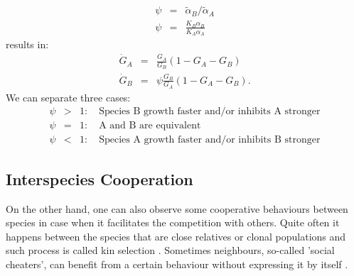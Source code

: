 \documentclass[10pt,A4paper]{article}
\begin{document}
\begin{eqnarray}
\psi&=&\tilde{\alpha}_B/\tilde{\alpha}_A\\
\psi&=&\frac{K_B\alpha_B}{K_A\alpha_A}
\end{eqnarray}
results in: 
\begin{eqnarray}
\dot{G}_A &=&\frac{G_A}{G_B}\left(1 - G_A-G_B\right )\\
\dot{G}_B &=&\psi\frac{G_B}{G_A}\left(1-G_A-G_B\right ). 
\end{eqnarray}
We can separate three cases: 
\begin{eqnarray}
\psi&>&1:\quad\text{Species B growth faster and/or inhibits A stronger}\\
\psi&=&1:\quad\text{A and B are equivalent}\\
\psi&<&1:\quad\text{Species A growth faster and/or inhibits B stronger}
\end{eqnarray}

\subsection{Interspecies Cooperation}

On the other hand, one can also observe some cooperative behaviours between species in case when it facilitates the competition with others.
Quite often it happens between the species that are close relatives or clonal populations and such process is called kin selection \cite{west_social_2007}.
Sometimes neighbours, so-called 'social cheaters', can benefit from a certain behaviour without expressing it by itself \cite{rainey_evolution_2003}.

\end{document}
